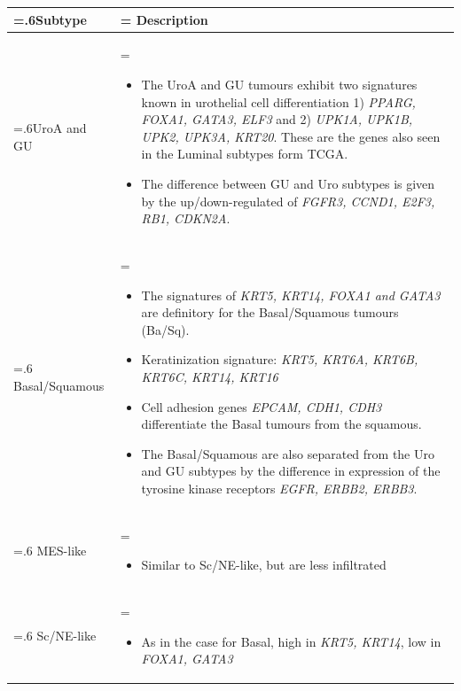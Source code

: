 \begin{table}[H]
    \centering
    \begin{tabularx}{\textwidth}{>{\hsize=.6\hsize}X |>{\hsize=\hsize}X}
    \toprule
    Subtype & Description \\
    \midrule
    UroA and GU & 
    \begin{itemize}[leftmargin=*, nosep, after=\vspace{-\baselineskip}]
        \item The UroA and GU tumours exhibit two signatures known in urothelial cell differentiation 1) \textit{PPARG, FOXA1, GATA3, ELF3} and 2) \textit{UPK1A, UPK1B, UPK2, UPK3A, KRT20}. These are the genes also seen in the Luminal subtypes form TCGA.
        \item The difference between GU and Uro subtypes is given by the up/down-regulated of \textit{FGFR3, CCND1, E2F3, RB1, CDKN2A}.
    \end{itemize} \\
    \midrule
    Basal/Squamous & 
    \begin{itemize}[leftmargin=*, nosep, after=\vspace{-\baselineskip}]
        \item The signatures of \textit{KRT5, KRT14, FOXA1 and GATA3} are definitory for the Basal/Squamous tumours (Ba/Sq). 
        \item Keratinization signature: \textit{KRT5, KRT6A, KRT6B, KRT6C, KRT14, KRT16}
        \item Cell adhesion genes \textit{EPCAM, CDH1, CDH3} differentiate the Basal tumours from the squamous.
        \item The Basal/Squamous are also separated from the Uro and GU subtypes by the difference in expression of the tyrosine kinase receptors \textit{EGFR, ERBB2, ERBB3}.
    \end{itemize} \\
    \midrule
    MES-like & 
    \begin{itemize}[leftmargin=*, nosep, after=\vspace{-\baselineskip}]
        \item Similar to Sc/NE-like, but are less infiltrated
    \end{itemize} \\
    \midrule
    Sc/NE-like & 
    \begin{itemize}[leftmargin=*, nosep, after=\vspace{-\baselineskip}]
        \item As in the case for Basal, high in \textit{KRT5, KRT14}, low in \textit{FOXA1, GATA3}

\end{itemize}
\end{tabularx}
\end{table}
